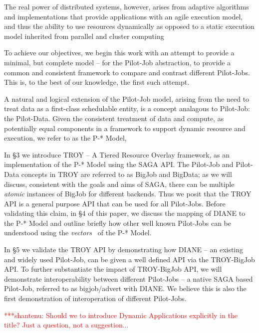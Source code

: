 \documentclass[conference,final]{IEEEtran}
\newcommand{\jhanote}[1]{ {\textcolor{red} { ***shantenu: #1 }}}
\newcommand{\jhanote}[1]{}
\begin{document}
The real power of distributed systems, however, arises from adaptive algorithms
and implementations that provide applications with an agile execution model, and
thus the ability to use resources dynamically as opposed to a static execution
model inherited from parallel and cluster computing



To achieve our objectives, we begin this work with an attempt to
provide a minimal, but complete model -- for the Pilot-Job
abstraction, to provide a common and consistent framework to compare
and contrast different Pilot-Jobs. This is, to the best of our
knowledge, the first such attempt.

A natural and logical extension of the Pilot-Job model, arising from
the need to treat data as a first-class schedulable entity, is a
concept analagous to Pilot-Job: the Pilot-Data. Given the consistent
treatment of data and compute, as potentially equal components in a
framework to support dynamic resource and execution, we refer to as
the P-* Model,

In \S3 we introduce TROY -- A Tiered Resource Overlay framework, as an
implementation of the P-* Model using the SAGA API. The Pilot-Job and
Pilot-Data concepts in TROY are referred to as BigJob and BigData; as
we will discuss, consistent with the goals and aims of SAGA, there can
be multiple {\it atomic} instances of BigJob for different backends.
Thus we posit that the TROY API is a general purpose API that can be
used for all Pilot-Jobs. Before validating this claim, in \S4 of this
paper, we discuss the mapping of DIANE to the P-* Model and outline
briefly how other well known Pilot-Jobs can be understood using the
{\it vectors}~\cite{dpa_surveypaper} of the P-* Model.

In \S5 we validate the TROY API by demonstrating how DIANE -- an
existing and widely used Pilot-Job, can be given a well defined API
via the TROY-BigJob API. To further substantiate the impact of
TROY-BigJob API, we will demonstrate interoperability between
different Pilot-Jobs -- a native SAGA based Pilot-Job, referred to as
bigjob/advert with DIANE.  We believe this is also the first
demonstration of interoperation of different Pilot-Jobs.

\jhanote{Should we to introduce Dynamic Applications explicitly in the
  title? Just a question, not a suggestion...}
\end{document}

